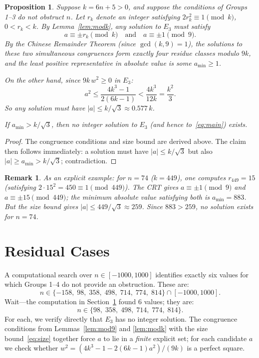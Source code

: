 \documentclass[12pt]{article}
\newtheorem{proposition}[theorem]{Proposition}
\newtheorem*{remark}{Remark}
\begin{document}
\begin{proposition}\label{prop:group4}
Suppose $k = 6n+5 > 0$, and suppose the conditions of Groups 1--3 do not obstruct $n$.
Let $r_k$ denote an integer satisfying $2r_k^2 \equiv 1 \pmod k$, $0 < r_k < k$.
By Lemma~\ref{lem:modk}, any solution to $E_3$ must satisfy
\[
a \equiv \pm r_k \pmod{k} \quad \text{and} \quad a \equiv \pm 1 \pmod{9}.
\]
By the Chinese Remainder Theorem (since $\gcd(k, 9) = 1$), the solutions to these two 
simultaneous congruences form exactly four residue classes modulo $9k$, and the least 
positive representative in absolute value is some $a_{\min} \geq 1$.
\medskip

On the other hand, since $9k\,w^2 \geq 0$ in $E_3$:
\begin{equation}\label{eq:size}
a^2 \leq \frac{4k^3 - 1}{2(6k-1)} < \frac{4k^3}{12k} = \frac{k^2}{3}.
\end{equation}
So any solution must have $|a| \leq k/\sqrt{3} \approx 0.577\,k$.
\medskip

If $a_{\min} > k/\sqrt{3}$, then no integer solution to $E_3$ (and hence to~\eqref{eq:main}) exists.
\end{proposition}
\begin{proof}
The congruence conditions and size bound are derived above. 
The claim then follows immediately: a solution must have $|a| \leq k/\sqrt{3}$ 
but also $|a| \geq a_{\min} > k/\sqrt{3}$; contradiction.
\end{proof}

\begin{remark}
As an explicit example: for $n = 74$ ($k = 449$), one computes $r_{449} = 15$ 
(satisfying $2 \cdot 15^2 = 450 \equiv 1 \pmod{449}$).
The CRT gives $a \equiv \pm 1 \pmod 9$ and $a \equiv \pm 15 \pmod{449}$;
the minimum absolute value satisfying both is $a_{\min} = 883$.
But the size bound gives $|a| \leq 449/\sqrt{3} \approx 259$.
Since $883 > 259$, no solution exists for $n = 74$.
\end{remark}

\section{Residual Cases}\label{sec:residual}

A computational search over $n \in [-1000, 1000]$ identifies exactly six values for which 
Groups 1--4 do not provide an obstruction. These are:
\[
n \in \{-158,\; 98,\; 358,\; 498,\; 714,\; 774,\; 814\} \cap [-1000, 1000].
\]
Wait---the computation in Section~\ref{sec:residual} found 6 values; they are:
\begin{equation}\label{eq:hardcases}
n \in \{98,\; 358,\; 498,\; 714,\; 774,\; 814\}.
\end{equation}
For each, we verify directly that $E_3$ has no integer solution. 
The congruence conditions from Lemmas~\ref{lem:mod9} and \ref{lem:modk} 
with the size bound~\eqref{eq:size} together force $a$ to lie in a \emph{finite} explicit set; 
for each candidate $a$ we check whether $w^2 = (4k^3 - 1 - 2(6k-1)a^2)/(9k)$ is a perfect square.
\end{document}

